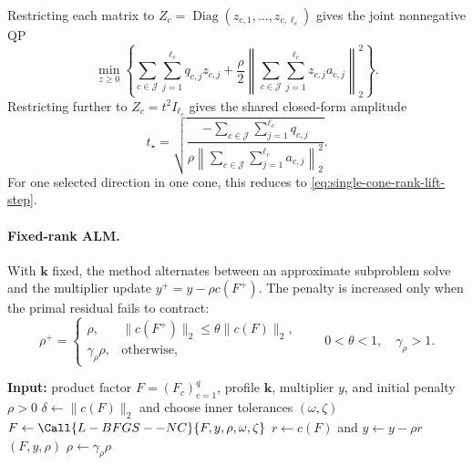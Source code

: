 \documentclass[11pt]{article}
\theoremstyle{definition}
\theoremstyle{remark}
\begin{document}
Restricting each matrix to
$Z_c=\operatorname{Diag}(z_{c,1},\ldots,z_{c,\ell_c})$ gives the joint
nonnegative QP
\begin{equation}
  \min_{z\geq0}
  \left\{
    \sum_{c\in\mathcal J}\sum_{j=1}^{\ell_c}q_{c,j}z_{c,j}
    +\frac{\rho}{2}
      \left\|
        \sum_{c\in\mathcal J}\sum_{j=1}^{\ell_c}z_{c,j}a_{c,j}
      \right\|_2^2
  \right\}.
  \label{eq:diagonal-rank-lift-qp}
\end{equation}
Restricting further to $Z_c=t^2I_{\ell_c}$ gives the shared closed-form
amplitude
\begin{equation}
  t_\star
  =
  \sqrt{
    \frac{-\sum_{c\in\mathcal J}\sum_{j=1}^{\ell_c}q_{c,j}}
    {\rho\left\|
      \sum_{c\in\mathcal J}\sum_{j=1}^{\ell_c}a_{c,j}
    \right\|_2^2}
  }.
  \label{eq:product-common-rank-lift-step}
\end{equation}
For one selected direction in one cone, this reduces to
\eqref{eq:single-cone-rank-lift-step}.

\paragraph{Fixed-rank ALM.}
With $\mathbf k$ fixed, the method alternates between an approximate subproblem
solve and the multiplier update $y^+=y-\rho c(F^+)$.  The penalty is
increased only when the primal residual fails to contract:
\begin{equation}
  \rho^+
  =
  \begin{cases}
    \rho,
      & \|c(F^+)\|_2\leq\theta\|c(F)\|_2,\\
    \gamma_\rho\rho,
      & \text{otherwise},
  \end{cases}
  \qquad
  0<\theta<1,
  \quad
  \gamma_\rho>1.
  \label{eq:penalty-update}
\end{equation}

\begin{algorithm}[H]
\caption{Fixed-rank augmented-Lagrangian method}
\label{alg:fixed-rank-alm}
\begin{algorithmic}[1]
\State \textbf{Input:} product factor $F=(F_c)_{c=1}^q$, profile $\mathbf k$,
multiplier $y$, and initial penalty $\rho>0$
\Loop
  \State $\delta\gets\|c(F)\|_2$ and choose inner tolerances
    $(\omega,\zeta)$
  \State $F\gets\Call{L-BFGS--NC}{F,y,\rho,\omega,\zeta}$
  \State $r\gets c(F)$ and $y\gets y-\rho r$
    \State \Return $(F,y,\rho)$
  \EndIf
    \State $\rho\gets\gamma_\rho\rho$
  \EndIf
\EndLoop
\end{algorithmic}
\end{algorithm}
\end{document}
